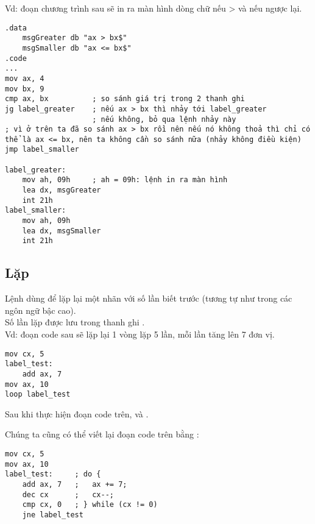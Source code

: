 \documentclass[main.tex]{subfiles}
\begin{document}
Vd: đoạn chương trình sau sẽ in ra màn hình dòng chữ  nếu  >  và  nếu ngược lại.
\begin{verbatim}
.data 
    msgGreater db "ax > bx$"
    msgSmaller db "ax <= bx$"
.code 
...
mov ax, 4 
mov bx, 9
cmp ax, bx          ; so sánh giá trị trong 2 thanh ghi  
jg label_greater    ; nếu ax > bx thì nhảy tới label_greater 
                    ; nếu không, bỏ qua lệnh nhảy này  
; vì ở trên ta đã so sánh ax > bx rồi nên nếu nó không thoả thì chỉ có thể là ax <= bx, nên ta không cần so sánh nữa (nhảy không điều kiện)
jmp label_smaller   

label_greater:
    mov ah, 09h     ; ah = 09h: lệnh in ra màn hình 
    lea dx, msgGreater
    int 21h
label_smaller:
    mov ah, 09h
    lea dx, msgSmaller
    int 21h
\end{verbatim}

\subsection{Lặp }
Lệnh  dùng để lặp lại một nhãn với số lần biết trước (tương tự như  trong các ngôn ngữ bậc cao).\\
Số lần lặp được lưu trong thanh ghi .\\
Vd: đoạn code sau sẽ lặp lại 1 vòng lặp 5 lần, mỗi lần tăng  lên 7 đơn vị.
\begin{verbatim}
mov cx, 5
label_test:
    add ax, 7
mov ax, 10
loop label_test
\end{verbatim}
Sau khi thực hiện đoạn code trên,  và .

Chúng ta cũng có thể viết lại đoạn code trên bằng :
\begin{verbatim}
mov cx, 5
mov ax, 10
label_test:     ; do {
    add ax, 7   ;   ax += 7;
    dec cx      ;   cx--;
    cmp cx, 0   ; } while (cx != 0)
    jne label_test
\end{verbatim}
\end{document}
